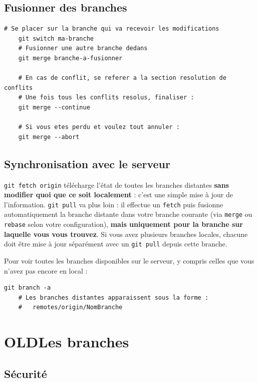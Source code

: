 \documentclass[11pt,a4paper]{article}
\begin{document}
\subsection*{Fusionner des branches}

\begin{lstlisting}[style=bashstyle]
	# Se placer sur la branche qui va recevoir les modifications
	git switch ma-branche
	# Fusionner une autre branche dedans
	git merge branche-a-fusionner
	
	# En cas de conflit, se referer a la section resolution de conflits
	# Une fois tous les conflits resolus, finaliser :
	git merge --continue
	
	# Si vous etes perdu et voulez tout annuler :
	git merge --abort
\end{lstlisting}

\subsection*{Synchronisation avec le serveur}

\texttt{git fetch origin} télécharge l'état de toutes les branches 
distantes \textbf{sans modifier quoi que ce soit localement} : c'est 
une simple mise à jour de l'information. \texttt{git pull} va plus 
loin : il effectue un \texttt{fetch} puis fusionne automatiquement 
la branche distante dans votre branche courante (via \texttt{merge} 
ou \texttt{rebase} selon votre configuration), \textbf{mais uniquement 
	pour la branche sur laquelle vous vous trouvez}. Si vous avez plusieurs 
branches locales, chacune doit être mise à jour séparément avec un 
\texttt{git pull} depuis cette branche.

Pour voir toutes les branches disponibles sur le serveur, y compris 
celles que vous n'avez pas encore en local :

\begin{lstlisting}[style=bashstyle]
	git branch -a
	# Les branches distantes apparaissent sous la forme :
	#   remotes/origin/NomBranche
\end{lstlisting}

\section{OLDLes branches}


\subsection*{Sécurité}
\end{document}
